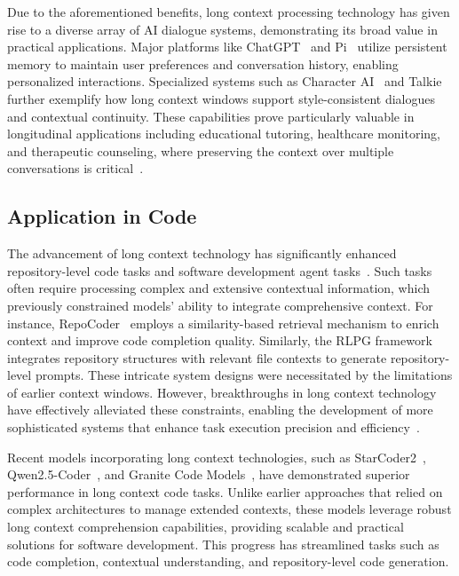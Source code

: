 \documentclass[11pt, a4paper, logo, copyright, nonumbering]{map}
\begin{document}
Due to the aforementioned benefits, long context processing technology has given rise to a diverse array of AI dialogue systems, demonstrating its broad value in practical applications. Major platforms like ChatGPT~\citep{openai2024memory} and Pi~\citep{inflection2023impi} utilize persistent memory to maintain user preferences and conversation history, enabling personalized interactions. Specialized systems such as Character AI~\citep{character_ai} and Talkie~\citep{talkie} further exemplify how long context windows support style-consistent dialogues and contextual continuity. These capabilities prove particularly valuable in longitudinal applications including educational tutoring, healthcare monitoring, and therapeutic counseling, where preserving the context over multiple conversations is critical~\cite{jo2024understanding}.




\subsection{Application in Code}

The advancement of long context technology has significantly enhanced repository-level code tasks and software development agent tasks~\cite{jiang2024survey}. Such tasks often require processing complex and extensive contextual information, which previously constrained models' ability to integrate comprehensive context. For instance, RepoCoder~\cite{zhang2023repocoder} employs a similarity-based retrieval mechanism to enrich context and improve code completion quality. Similarly, the RLPG framework~\cite{Shrivastava2022RepositoryLevelPG} integrates repository structures with relevant file contexts to generate repository-level prompts. These intricate system designs were necessitated by the limitations of earlier context windows. However, breakthroughs in long context technology have effectively alleviated these constraints, enabling the development of more sophisticated systems that enhance task execution precision and efficiency~\cite{shrivastava2023repofusion}. 

Recent models incorporating long context technologies, such as StarCoder2~\cite{lozhkov2024starcoder2stackv2}, Qwen2.5-Coder~\cite{hui2024qwen2}, and Granite Code Models~\cite{DBLP:journals/corr/abs-2405-04324}, have demonstrated superior performance in long context code tasks. Unlike earlier approaches that relied on complex architectures to manage extended contexts, these models leverage robust long context comprehension capabilities, providing scalable and practical solutions for software development. This progress has streamlined tasks such as code completion, contextual understanding, and repository-level code generation.
\end{document}
